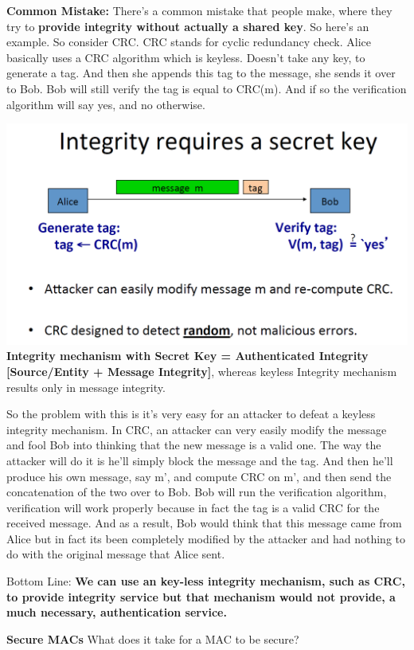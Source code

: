 \documentclass[11pt]{article}
\makeatletter
\def\maxwidth{\ifdim\Gin@nat@width>\linewidth\linewidth
    \else\Gin@nat@width\fi}
\let\Oldincludegraphics\includegraphics
\renewcommand{\includegraphics}[1]{\Oldincludegraphics[width=.8\maxwidth]{#1}}
\makeatother
\begin{document}
\textbf{Common Mistake:} There's a common mistake that people make,
where they try to \textbf{provide integrity without actually a shared
key}. So here's an example. So consider CRC. CRC stands for cyclic
redundancy check. Alice basically uses a CRC algorithm which is keyless.
Doesn't take any key, to generate a tag. And then she appends this tag
to the message, she sends it over to Bob. Bob will still verify the tag
is equal to CRC(m). And if so the verification algorithm will say yes,
and no otherwise.

\includegraphics{./Images/IntegrityRequireSKey.png} \textbf{Integrity
mechanism with Secret Key = Authenticated Integrity {[}Source/Entity +
Message Integrity{]}}, whereas keyless Integrity mechanism results only
in message integrity.

So the problem with this is it's very easy for an attacker to defeat a
keyless integrity mechanism. In CRC, an attacker can very easily modify
the message and fool Bob into thinking that the new message is a valid
one. The way the attacker will do it is he'll simply block the message
and the tag. And then he'll produce his own message, say m', and compute
CRC on m', and then send the concatenation of the two over to Bob. Bob
will run the verification algorithm, verification will work properly
because in fact the tag is a valid CRC for the received message. And as
a result, Bob would think that this message came from Alice but in fact
its been completely modified by the attacker and had nothing to do with
the original message that Alice sent.

Bottom Line: \textbf{We can use an key-less integrity mechanism, such as
CRC, to provide integrity service but that mechanism would not provide,
a much necessary, authentication service.}

\textbf{Secure MACs} What does it take for a MAC to be secure?
\end{document}
